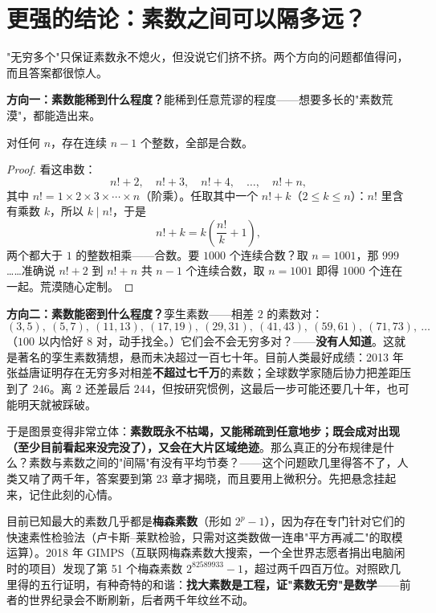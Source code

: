\section{更强的结论：素数之间可以隔多远？}

"无穷多个"只保证素数永不熄火，但没说它们挤不挤。两个方向的问题都值得问，而且答案都很惊人。

\textbf{方向一：素数能稀到什么程度？}能稀到任意荒谬的程度——想要多长的"素数荒漠"，都能造出来。

\begin{dingli}
对任何 $n$，存在连续 $n-1$ 个整数，全部是合数。
\end{dingli}

\begin{proof}
看这串数：
\[
n! + 2,\quad n! + 3,\quad n! + 4,\quad \dots,\quad n! + n ,
\]
其中 $n! = 1\times2\times3\times\cdots\times n$（阶乘）。任取其中一个 $n! + k$（$2 \le k \le n$）：$n!$ 里含有乘数 $k$，所以 $k \mid n!$，于是
\[
n! + k = k\left(\frac{n!}{k} + 1\right),
\]
两个都大于 $1$ 的整数相乘——合数。要 $1000$ 个连续合数？取 $n = 1001$，那 $999$……准确说 $n!+2$ 到 $n!+n$ 共 $n-1$ 个连续合数，取 $n = 1001$ 即得 $1000$ 个连在一起。荒漠随心定制。
\end{proof}

\textbf{方向二：素数能密到什么程度？}孪生素数——相差 $2$ 的素数对：
\[
(3,5),\ (5,7),\ (11,13),\ (17,19),\ (29,31),\ (41,43),\ (59,61),\ (71,73),\ \dots
\]
（$100$ 以内恰好 $8$ 对，动手找全。）它们会不会无穷多对？——\textbf{没有人知道}。这就是著名的孪生素数猜想，悬而未决超过一百七十年。目前人类最好成绩：2013 年张益唐证明存在无穷多对相差\textbf{不超过七千万}的素数；全球数学家随后协力把差距压到了 $246$。离 $2$ 还差最后 $244$，但按研究惯例，这最后一步可能还要几十年，也可能明天就被踩破。

于是图景变得非常立体：\textbf{素数既永不枯竭，又能稀疏到任意地步；既会成对出现（至少目前看起来没完没了），又会在大片区域绝迹}。那么真正的分布规律是什么？素数与素数之间的"间隔"有没有平均节奏？——这个问题欧几里得答不了，人类又啃了两千年，答案要到第 23 章才揭晓，而且要用上微积分。先把悬念挂起来，记住此刻的心情。

\begin{lishi}
目前已知最大的素数几乎都是\textbf{梅森素数}（形如 $2^p - 1$），因为存在专门针对它们的快速素性检验法（卢卡斯--莱默检验，只需对这类数做一连串"平方再减二"的取模运算）。2018 年 GIMPS（互联网梅森素数大搜索，一个全世界志愿者捐出电脑闲时的项目）发现了第 51 个梅森素数 $2^{82589933} - 1$，超过两千四百万位。对照欧几里得的五行证明，有种奇特的和谐：\textbf{找大素数是工程，证"素数无穷"是数学}——前者的世界纪录会不断刷新，后者两千年纹丝不动。
\end{lishi}

